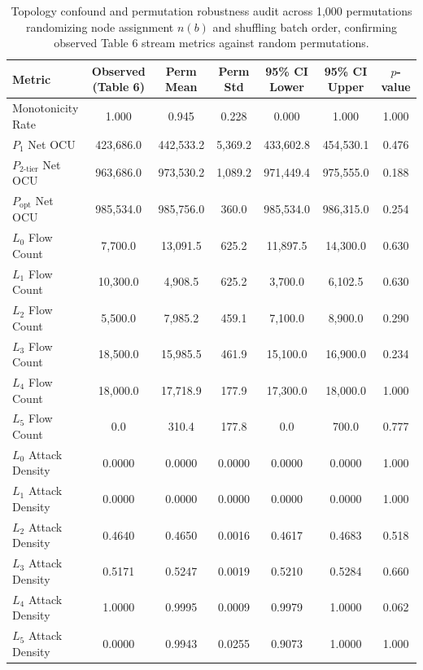 \documentclass[journal,10pt,onecolumn]{IEEEtran}
\begin{document}
\begin{table}[t]
\caption{Topology confound and permutation robustness audit across 1,000 permutations randomizing node assignment $n(b)$ and shuffling batch order, confirming observed Table 6 stream metrics against random permutations.}
\label{tab:topology_confound_summary}
\centering
\small
\begin{tabular}{lcccccc}
\toprule
\textbf{Metric} & \textbf{Observed (Table 6)} & \textbf{Perm Mean} & \textbf{Perm Std} & \textbf{95\% CI Lower} & \textbf{95\% CI Upper} & \textbf{$p$-value} \\
\midrule
Monotonicity Rate & 1.000 & 0.945 & 0.228 & 0.000 & 1.000 & 1.000 \\
$P_1$ Net OCU & 423,686.0 & 442,533.2 & 5,369.2 & 433,602.8 & 454,530.1 & 0.476 \\
$P_{2\text{-tier}}$ Net OCU & 963,686.0 & 973,530.2 & 1,089.2 & 971,449.4 & 975,555.0 & 0.188 \\
$P_{\text{opt}}$ Net OCU & 985,534.0 & 985,756.0 & 360.0 & 985,534.0 & 986,315.0 & 0.254 \\
$L_0$ Flow Count & 7,700.0 & 13,091.5 & 625.2 & 11,897.5 & 14,300.0 & 0.630 \\
$L_1$ Flow Count & 10,300.0 & 4,908.5 & 625.2 & 3,700.0 & 6,102.5 & 0.630 \\
$L_2$ Flow Count & 5,500.0 & 7,985.2 & 459.1 & 7,100.0 & 8,900.0 & 0.290 \\
$L_3$ Flow Count & 18,500.0 & 15,985.5 & 461.9 & 15,100.0 & 16,900.0 & 0.234 \\
$L_4$ Flow Count & 18,000.0 & 17,718.9 & 177.9 & 17,300.0 & 18,000.0 & 1.000 \\
$L_5$ Flow Count & 0.0 & 310.4 & 177.8 & 0.0 & 700.0 & 0.777 \\
$L_0$ Attack Density & 0.0000 & 0.0000 & 0.0000 & 0.0000 & 0.0000 & 1.000 \\
$L_1$ Attack Density & 0.0000 & 0.0000 & 0.0000 & 0.0000 & 0.0000 & 1.000 \\
$L_2$ Attack Density & 0.4640 & 0.4650 & 0.0016 & 0.4617 & 0.4683 & 0.518 \\
$L_3$ Attack Density & 0.5171 & 0.5247 & 0.0019 & 0.5210 & 0.5284 & 0.660 \\
$L_4$ Attack Density & 1.0000 & 0.9995 & 0.0009 & 0.9979 & 1.0000 & 0.062 \\
$L_5$ Attack Density & 0.0000 & 0.9943 & 0.0255 & 0.9073 & 1.0000 & 1.000 \\
\bottomrule
\end{tabular}
\end{table}
\end{document}
